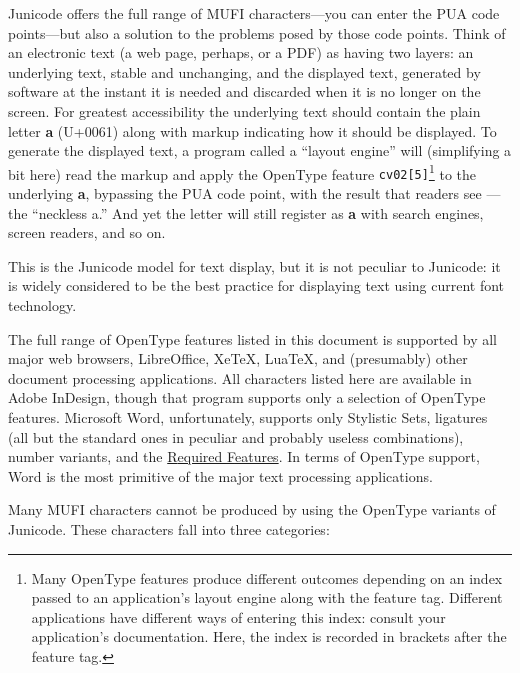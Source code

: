 \documentclass[letterpaper,12pt]{article}
\newcommand\textLetterExample[1]{\textrm{\textbf{\color{BrickRed}#1}}}
\newcommand\textSourceText[1]{{\color{GGOrange}\texttt{#1}}}
\newcommand{\cvd}[3][0]{{\addfontfeature{CharacterVariant=#2:#1}#3}}
\begin{document}
Junicode offers the full range of MUFI characters---you can enter the PUA code points---but also a solution to the
problems posed by those code points. Think of an electronic text (a web page, perhaps, or a PDF) as having two layers:
an underlying text, stable and unchanging, and the displayed text, generated by software at the instant it is needed
and discarded when it is no longer on the screen. For greatest accessibility the underlying text should contain the
plain letter \textLetterExample{a} (U+0061) along with markup indicating how it should be displayed. To generate
the displayed text, a program called a ``layout engine'' will (simplifying a bit here) read the markup and apply the
OpenType feature \textSourceText{cv02[5]}\footnote{Many OpenType features produce different outcomes depending on
an index passed to an application's layout engine along with the feature tag. Different applications have different
ways of entering this index: consult your application's documentation. Here, the index is recorded in brackets after
the feature tag.\par } to the underlying \textLetterExample{a}, bypassing the PUA code point, with the result that
readers see \textLetterExample{\cvd[4]{2}{a}}{}---the ``neckless a.'' And yet the letter will still register as
\textLetterExample{a} with search engines, screen readers, and so on.

This is the Junicode model for text display, but it is not peculiar to Junicode: it is widely considered to be the best
practice for displaying text using current font technology.

The full range of OpenType features listed in this document is supported by all major web browsers, LibreOffice, XeTeX,
LuaTeX, and (presumably) other document processing applications. All characters listed here are available in Adobe
InDesign, though that program supports only a selection of OpenType features. Microsoft Word, unfortunately, supports
only Stylistic Sets, ligatures (all but the standard ones in peculiar and probably useless combinations), number
variants, and the \hyperlink{req}{R}\hyperlink{req}{equired }\hyperlink{req}{F}\hyperlink{req}{eatures}. In terms of
OpenType support, Word is the most primitive of the major text processing applications.

Many MUFI characters cannot be produced by using the OpenType variants of Junicode. These characters fall into three
categories:
\end{document}
